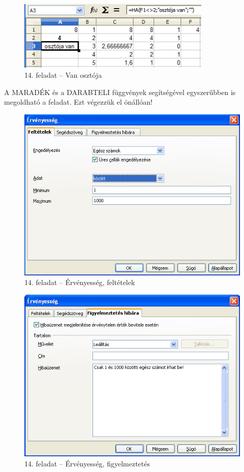 \begin{figure}[!h]
\begin{center}
\includegraphics[width=9.211cm]{oocalcv2-img80.png}
\caption{14. feladat -- Van osztója}\label{14-feladatOsztó}
\end{center}
\end{figure}

A MARADÉK és a DARABTELI függvények segítségével egyszerűbben
is megoldható a feladat. Ezt  végezzük el önállóan!

\begin{figure}[!h]
\begin{center}
\includegraphics[width=11.444cm]{oocalcv2-img81.png}
\caption{14. feladat -- Érvényesség, feltételek}\label{14-feladatFeltétel}
\end{center}
\end{figure}

\begin{figure}[!h ]
\begin{center}
\includegraphics[width=11.47cm]{oocalcv2-img82.png}
\caption{14. feladat -- Érvényesség, figyelmeztetés}\label{14-feladatFigy}
\end{center}
\end{figure}

